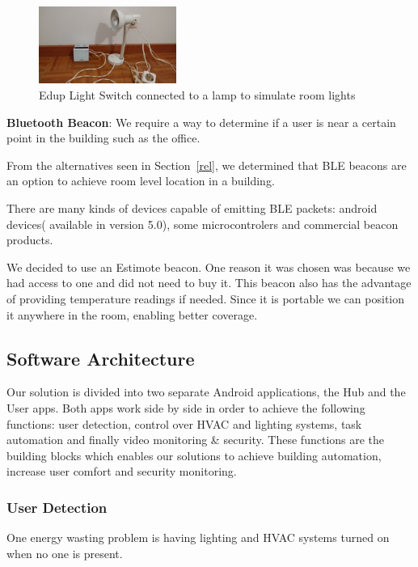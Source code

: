 \documentclass[conference]{IEEEtran}
\begin{document}
\begin{figure}[htbp]
\centering
\includegraphics[width=0.4\textwidth]{Figures/imp_light_switch_light}
\caption{Edup Light Switch connected to a lamp to simulate room lights}
\label{imp_light_switch_light}
\end{figure}


\textbf{Bluetooth Beacon}: We require a way to determine if a user is near a certain point in the building such as the office.

From the alternatives seen in Section~\ref{rel}, we  determined that \ac{BLE} beacons are an option to achieve room level location in a building.

There are many kinds of devices capable of emitting \ac{BLE} packets: android devices( available in version 5.0), some microcontrolers and commercial beacon products.

We decided to use an Estimote beacon. One reason it was chosen was because we had access to one and did not need to buy it. This beacon also has the advantage of providing temperature readings if needed. Since it is portable we can position it anywhere in the room, enabling better coverage.


\subsection{Software Architecture}

Our solution is divided into two separate Android applications, the Hub and the User apps. Both apps work side by side in order to achieve the following functions: user detection, control over \ac{HVAC} and lighting systems, task automation and finally video monitoring \& security. These functions are the building blocks which enables our solutions to achieve building automation, increase user comfort and security monitoring.


\subsubsection{User Detection}\label{user_detection_imp}

One energy wasting problem is having lighting and \ac{HVAC} systems turned on when no one is present.
\end{document}
